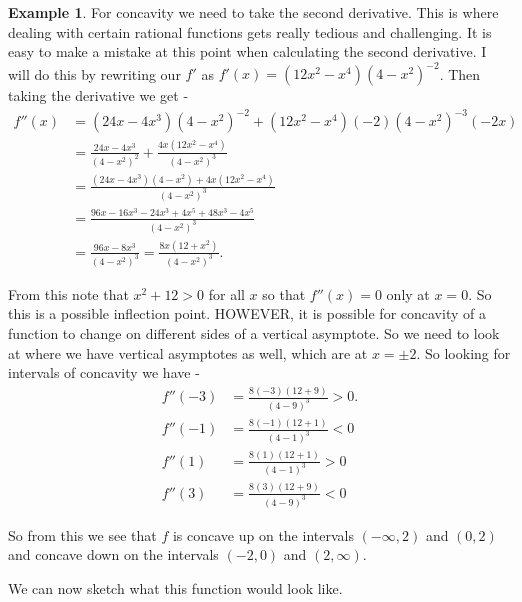 \documentclass[12pt,reqno]{article}
\theoremstyle{definition}
\newtheorem*{Example}{Example}
\begin{document}
\begin{Example}
	For concavity we need to take the second derivative. This is where dealing with certain rational functions gets really tedious and challenging. It is easy to make a mistake at this point when calculating the second derivative. I will do this by rewriting our $f'$ as $f'(x) = (12x^2 - x^4)(4 - x^2)^{-2}$. Then taking the derivative we get -
	\begin{align*}
		f''(x) &= (24x - 4x^3)(4 - x^2)^{-2} + (12x^2 - x^4)(-2)(4 - x^2)^{-3}(-2x) \\
			   &= \frac{24x - 4x^3}{(4 -x^2)^{2}} + \frac{4x(12x^2 - x^4)}{(4 - x^2)^3} \\
			   &= \frac{(24x - 4x^3)(4 - x^2) + 4x(12x^2 - x^4)}{(4 - x^2)^3} \\
			   &= \frac{96x - 16x^3 - 24x^3 + 4x^5 + 48x^3 - 4x^5}{(4 - x^2)^3} \\
			   &= \frac{96x - 8x^3}{(4 - x^2)^3} = \frac{8x (12 + x^2)}{(4 - x^2)^3}. 
	\end{align*}
	
	From this note that $x^2 + 12 > 0$ for all $x$ so that $f''(x) = 0$ only at $x = 0$. So this is a possible inflection point. HOWEVER, it is possible for concavity of a function to change on different sides of a vertical asymptote. So we need to look at where we have vertical asymptotes as well, which are at $x = \pm 2$. So looking for intervals of concavity we have - 
	\begin{align*}
		f''(-3) &= \frac{8(-3)(12 + 9)}{(4 - 9)^{3}} > 0. \\
		f''(-1) &= \frac{8(-1)(12 + 1)}{(4 - 1)^3 } < 0 \\
		f''(1) &= \frac{8(1) (12 + 1)}{(4 - 1)^3 } > 0 \\ 
		f''(3) &= \frac{8(3) (12 + 9)}{(4 - 9)^3} < 0
	\end{align*}
	
	So from this we see that $f$ is concave up on the intervals $(-\infty, 2)$ and $(0, 2)$ and concave down on the intervals $(-2, 0)$ and $(2, \infty)$. 
	
	We can now sketch what this function would look like. 
	
\end{Example}
	
\end{document}
